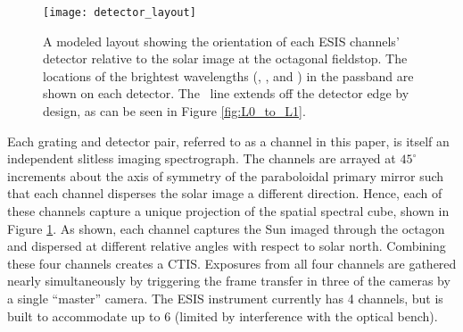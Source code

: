     	

    	

    	
        \begin{figure}[ht]
			\begin{center}
				\texttt{[image: detector\_layout]}
				\caption{A modeled layout showing the orientation of each ESIS channels' detector relative to the solar image at the octagonal fieldstop.  The locations of the brightest wavelengths (\hei, \mgxbright, and \ov) in the passband are shown on each detector.  The \hei \ line  extends off the detector edge by design, as can be seen in Figure \ref{fig:L0_to_L1}. }
				\label{fig:level_1_array}
			\end{center}
		\end{figure}

    	Each grating and detector pair, referred to as a channel in this paper,
    	is itself an independent slitless imaging spectrograph.  
    	The channels are arrayed at $45^{\circ}$ increments about the axis of symmetry of the paraboloidal primary mirror such that each channel disperses the solar image a different direction. 
    	Hence, each of these channels capture a unique projection of the spatial spectral cube, shown in Figure \ref{fig:level_1_array}. 
    	As shown, each channel captures the Sun imaged through the octagon and dispersed at different relative angles with respect to solar north. Combining these four channels creates a CTIS. 
    	Exposures from all four channels are gathered nearly simultaneously by triggering the frame transfer in three of the cameras by a single ``master'' camera. 
    	The ESIS instrument currently has 4 channels, but is built to accommodate up to 6 (limited by interference with the optical bench).

